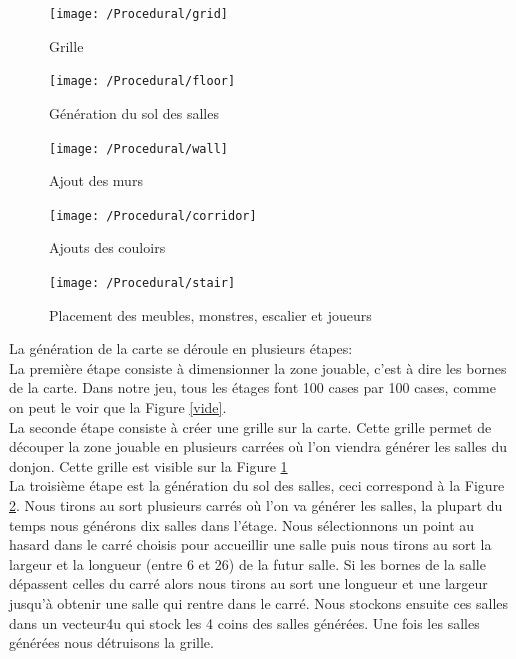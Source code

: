 \documentclass[a4paper, 12pt]{article}
\begin{document}
\begin{figure}
\center
\texttt{[image: /Procedural/grid]}
\caption{Grille}
\label{grid}
\end{figure}

\begin{figure}
\center
\texttt{[image: /Procedural/floor]}
\caption{Génération du sol des salles}
\label{floor}
\end{figure}

\begin{figure}
\center
\texttt{[image: /Procedural/wall]}
\caption{Ajout des murs}
\label{wall}
\end{figure}

\begin{figure}
\center
\texttt{[image: /Procedural/corridor]}
\caption{Ajouts des couloirs}
\label{corridor}
\end{figure}

\begin{figure}
\center
\texttt{[image: /Procedural/stair]}
\caption{Placement des meubles, monstres, escalier et joueurs}
\label{stair}
\end{figure}

La génération de la carte se déroule en plusieurs étapes: \\

La première étape consiste à dimensionner la zone jouable, c'est à dire les bornes de la carte. Dans notre jeu, tous les étages font 100 cases par 100 cases, comme on peut le voir que la Figure \ref{vide}.  \\

La seconde étape consiste à créer une grille sur la carte. Cette grille permet de découper la zone jouable en plusieurs carrées où l'on viendra générer les salles du donjon. Cette grille est visible sur la Figure \ref{grid}  \\

La troisième étape est la génération du sol des salles, ceci correspond à la Figure \ref{floor}. Nous tirons au sort plusieurs carrés où l'on va générer les salles, la plupart du temps nous générons dix salles dans l'étage. Nous sélectionnons un point au hasard dans le carré choisis pour accueillir une salle puis nous tirons au sort la largeur et la longueur (entre 6 et 26) de la futur salle. Si les bornes de la salle dépassent celles du carré alors nous tirons au sort une longueur et une largeur jusqu'à obtenir une salle qui rentre dans le carré. Nous stockons ensuite ces salles dans un vecteur4u qui stock les 4 coins des salles générées. Une fois les salles générées nous détruisons la grille. \\
\end{document}
